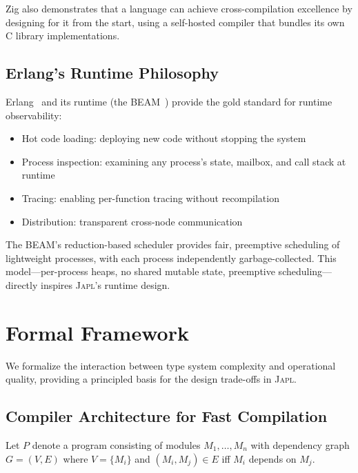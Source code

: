 \documentclass[11pt,twocolumn]{article}
\newcommand{\japl}{\textsc{Japl}}
\begin{document}
Zig also demonstrates that a language can achieve cross-compilation excellence by designing for it from the start, using a self-hosted compiler that bundles its own C library implementations.

\subsection{Erlang's Runtime Philosophy}

Erlang~\citep{armstrong2003erlang,armstrong2007erlang} and its runtime (the BEAM~\citep{happi2023beam}) provide the gold standard for runtime observability:
\begin{itemize}[leftmargin=*]
\item Hot code loading: deploying new code without stopping the system
\item Process inspection: examining any process's state, mailbox, and call stack at runtime
\item Tracing: enabling per-function tracing without recompilation
\item Distribution: transparent cross-node communication
\end{itemize}

The BEAM's reduction-based scheduler provides fair, preemptive scheduling of lightweight processes, with each process independently garbage-collected.
This model---per-process heaps, no shared mutable state, preemptive scheduling---directly inspires \japl{}'s runtime design.

\section{Formal Framework}
\label{sec:formal-framework}

We formalize the interaction between type system complexity and operational quality, providing a principled basis for the design trade-offs in \japl{}.

\subsection{Compiler Architecture for Fast Compilation}

Let $P$ denote a program consisting of modules $M_1, \ldots, M_n$ with dependency graph $G = (V, E)$ where $V = \{M_i\}$ and $(M_i, M_j) \in E$ iff $M_i$ depends on $M_j$.
\end{document}
